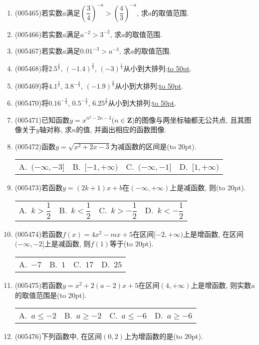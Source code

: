 \documentclass[10pt,a4paper]{article}
\newcommand{\blank}[1]{\underline{\hbox to #1pt{}}}
\newcommand{\bracket}[1]{(\hbox to #1pt{})}
\newcommand{\fourch}[4]{\par\begin{tabular}{p{.23\textwidth}p{.23\textwidth}p{.23\textwidth}p{.23\textwidth}}
A.~#1 &B.~#2& C.~#3& D.~#4
\end{tabular}}
\begin{document}
\begin{enumerate}[1.]
\begin{center}
\end{center}
\item {\tiny (005465)}若实数$a$满足$(\dfrac 34)^{-a}>(\dfrac 43)^{-a}$, 求$a$的取值范围.
\item {\tiny (005466)}若实数$a$满足$a^{-2}>3^{-2}$, 求$a$的取值范围.
\item {\tiny (005467)}若实数$a$满足$0.01^{-3}>a^{-3}$, 求$a$的取值范围.
\item {\tiny (005468)}将$2.5^{\frac 23}$, $(-1.4)^{\frac 23}$, $(-3)^{\frac 13}$从小到大排列:\blank{50}.
\item {\tiny (005469)}将$4.1^{\frac 25}$, $3.8^{-\frac 23}$, $(-1.9)^{\frac 35}$从小到大排列:\blank{50}.
\item {\tiny (005470)}将$0.16^{-\frac 34}$, $0.5^{-\frac 32}$, $6.25^{\frac 38}$从小到大排列:\blank{50}.
\item {\tiny (005471)}已知函数$y=x^{n^2-2n-3}$($n\in \mathbf{Z}$)的图像与两坐标轴都无公共点, 且其图像关于$y$轴对称, 求$n$的值, 并画出相应的函数图像.
\item {\tiny (005472)}函数$y=\sqrt {x^2+2x-3}$为减函数的区间是\bracket{20}.
\fourch{$(-\infty ,-3]$}{$[-1,+\infty)$}{$(-\infty ,-1]$}{$[1,+\infty)$}
\item {\tiny (005473)}若函数$y=(2k+1)x+b$在$(-\infty,+\infty)$上是减函数, 则\bracket{20}.
\fourch{$k>\dfrac 12$}{$k<\dfrac 12$}{$k>-\dfrac 12$}{$k<-\dfrac 12$}
\item {\tiny (005474)}若函数$f(x)=4x^2-mx+5$在区间$[-2,+\infty)$上是增函数, 在区间$(-\infty ,-2]$上是减函数, 则$f(1)$等于\bracket{20}.
\fourch{$-7$}{$1$}{$17$}{$25$}
\item {\tiny (005475)}若函数$y=x^2+2(a-2)x+5$在区间$(4,+\infty)$上是增函数, 则实数$a$的取值范围是\bracket{20}.
\fourch{$a\le -2$}{$a\ge -2$}{$a\le -6$}{$a\ge -6$}
\item {\tiny (005476)}下列函数中, 在区间$(0,2)$上为增函数的是\bracket{20}.

\end{enumerate}
\end{document}
